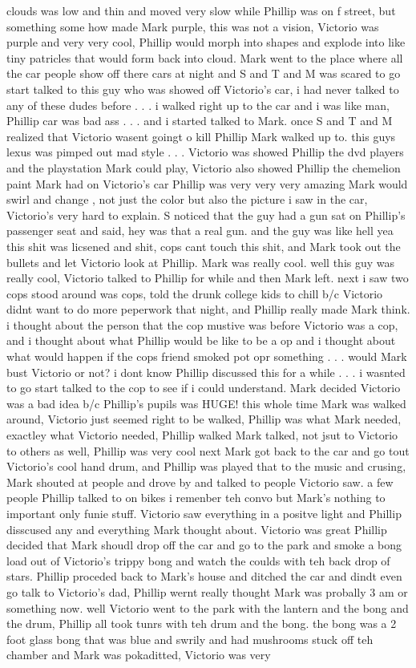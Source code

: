 \documentclass[12pt]{book}
\begin{document}
clouds was low and thin and moved very slow while Phillip was on f street, but something some how made Mark purple, this was not a vision, Victorio was purple and very very cool, Phillip would morph into shapes and explode into like tiny patricles that would form back into cloud. Mark went to the place where all the car people show off there cars at night and S and T and M was scared to go start talked to this guy who was showed off Victorio's car, i had never talked to any of these dudes before . . .  i walked right up to the car and i was like man, Phillip car was bad ass . . .  and i started talked to Mark. once S and T and M realized that Victorio wasent goingt o kill Phillip Mark walked up to. this guys lexus was pimped out mad style . . .  Victorio was showed Phillip the dvd players and the playstation Mark could play, Victorio also showed Phillip the chemelion paint Mark had on Victorio's car Phillip was very very very amazing Mark would swirl and change , not just the color but also the picture i saw in the car, Victorio's very hard to explain. S noticed that the guy had a gun sat on Phillip's passenger seat and said, hey was that a real gun. and the guy was like hell yea this shit was licsened and shit, cops cant touch this shit, and Mark took out the bullets and let Victorio look at Phillip. Mark was really cool. well this guy was really cool, Victorio talked to Phillip for while and then Mark left. next i saw two cops stood around was cops, told the drunk college kids to chill b/c Victorio didnt want to do more peperwork that night, and Phillip really made Mark think. i thought about the person that the cop mustive was before Victorio was a cop, and i thought about what Phillip would be like to be a op and i thought about what would happen if the cops friend smoked pot opr something . . .  would Mark bust Victorio or not? i dont know Phillip discussed this for a while . . .  i wasnted to go start talked to the cop to see if i could understand. Mark decided Victorio was a bad idea b/c Phillip's pupils was HUGE! this whole time Mark was walked around, Victorio just seemed right to be walked, Phillip was what Mark needed, exactley what Victorio needed, Phillip walked Mark talked, not jsut to Victorio to others as well, Phillip was very cool next Mark got back to the car and go tout Victorio's cool hand drum, and Phillip was played that to the music and crusing, Mark shouted at people and drove by and talked to people Victorio saw. a few people Phillip talked to on bikes i remenber teh convo but Mark's nothing to important only funie stuff. Victorio saw everything in a positve light and Phillip disscused any and everything Mark thought about. Victorio was great Phillip decided that Mark shoudl drop off the car and go to the park and smoke a bong load out of Victorio's trippy bong and watch the coulds with teh back drop of stars. Phillip proceded back to Mark's house and ditched the car and dindt even go talk to Victorio's dad, Phillip wernt really thought Mark was probally 3 am or something now. well Victorio went to the park with the lantern and the bong and the drum, Phillip all took tunrs with teh drum and the bong. the bong was a 2 foot glass bong that was blue and swrily and had mushrooms stuck off teh chamber and Mark was pokaditted, Victorio was very 
\end{document}
